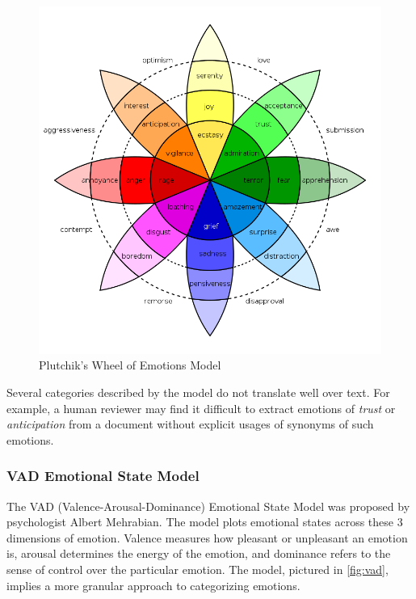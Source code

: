 \documentclass[11pt]{article}
\begin{document}
\begin{figure}[!ht]
  \includegraphics[scale=0.4]{../statics/wheel.png}
  \centering
  \caption{Plutchik's Wheel of Emotions Model}
  \label{fig:wheel}
\end{figure}


Several categories described by the model do not translate well over text. For example, a human reviewer may find it difficult to extract emotions of \textit{trust} or \textit{anticipation} from a document without explicit usages of synonyms of such emotions.

\subsubsection{VAD Emotional State Model}

The VAD (Valence-Arousal-Dominance) Emotional State Model was proposed by psychologist Albert Mehrabian. The model plots emotional states across these 3 dimensions of emotion. Valence measures how pleasant or unpleasant an emotion is, arousal determines the energy of the emotion, and dominance refers to the sense of control over the particular emotion. The model, pictured in \ref{fig:vad}, implies a more granular approach to categorizing emotions.
\end{document}
